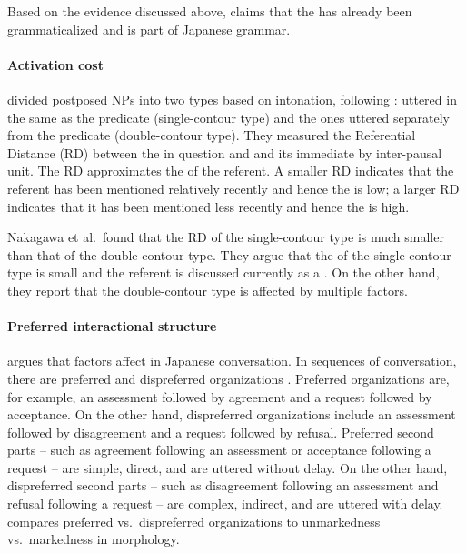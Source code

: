 Based on the evidence discussed above,
 claims that the  has already been grammaticalized and is part of Japanese grammar.


\paragraph{Activation cost}

 divided postposed NPs into two types
based on intonation,
following :
 uttered in the same  as the predicate (single-contour type) and
the ones uttered separately from the predicate (double-contour type).
They measured the Referential Distance (RD) between the  in question and and its immediate  by inter-pausal unit.
The RD approximates the  of the referent.
A smaller RD indicates that the referent has been mentioned relatively recently and hence the  is low;
a larger RD indicates that it has been mentioned less recently
and hence the  is high.

Nakagawa et al.~found that
the RD of the single-contour type is much smaller than that of the double-contour type.
They argue that the  of the single-contour type is small
and the referent is discussed currently as a .
On the other hand, they report that the double-contour type is affected by multiple factors.

\newpage
\paragraph{Preferred {interactional} structure}

 argues that
 factors affect  in Japanese conversation.
In sequences of conversation,
there are preferred and dispreferred organizations \cite{schegloffetal77,heritage84,pomerantz84}.
Preferred organizations are, for example,
an assessment followed by agreement and a request followed by acceptance.
On the other hand,
dispreferred organizations include
an assessment followed by disagreement and a request followed by refusal.
Preferred second parts -- such as agreement following an assessment or acceptance following a request -- are simple, direct, and are uttered without delay.
On the other hand,
dispreferred second parts -- such as disagreement following an assessment and refusal following a request -- are complex, indirect, and are uttered with delay.
 compares preferred vs.~dispreferred organizations to unmarkedness vs.~markedness in morphology.

